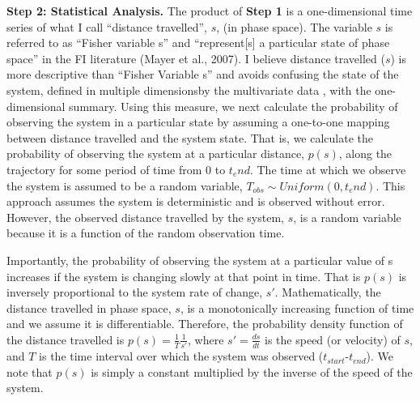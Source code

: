 \documentclass[12pt,twoside,openany]{reedthesis}
\begin{document}
\textbf{Step 2: Statistical Analysis.} The product of \textbf{Step 1} is a one-dimensional time series of what I call ``distance travelled'', \(s\), (in phase space). The variable \(s\) is referred to as ``Fisher variable s'' and ``represent{[}s{]} a particular state of phase space'' in the FI literature (Mayer et al., 2007). I believe distance travelled (\(s\)) is more descriptive than ``Fisher Variable s'' and avoids confusing the state of the system, defined in multiple dimensionsby the multivariate data , with the one-dimensional summary. Using this measure, we next calculate the probability of observing the system in a particular state by assuming a one-to-one mapping between distance travelled and the system state. That is, we calculate the probability of observing the system at a particular distance, \(p(s)\), along the trajectory for some period of time from 0 to \(t_end\). The time at which we observe the system is assumed to be a random variable, \(T_{obs} \sim Uniform(0,t_end)\). This approach assumes the system is deterministic and is observed without error. However, the observed distance travelled by the system, \(s\), is a random variable because it is a function of the random observation time.

Importantly, the probability of observing the system at a particular value of s increases if the system is changing slowly at that point in time. That is \(p(s)\) is inversely proportional to the system rate of change, \(s'\). Mathematically, the distance travelled in phase space, \(s\), is a monotonically increasing function of time and we assume it is differentiable. Therefore, the probability density function of the distance travelled is \(p(s)=\frac{1}{T}\frac{1}{s'}\), where \(s'=\frac{ds}{dt}\) is the speed (or velocity) of \(s\), and \(T\) is the time interval over which the system was observed (\(t_{start}\)-\(t_{end}\)). We note that \(p(s)\) is simply a constant multiplied by the inverse of the speed of the system.
\end{document}
